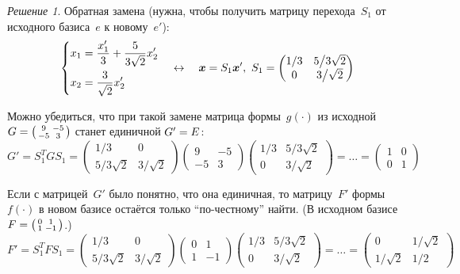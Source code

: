\documentclass[a4paper,12pt]{article}
\theoremstyle{remark}
\newtheorem*{finalsolution}{Решение}
\begin{document}
\begin{finalsolution}
    Обратная замена (нужна, чтобы получить матрицу перехода~$S_1$ от исходного базиса~$e$ к новому~$e'$):
    \[
      \left\{
        \begin{aligned}
          &x_1 = \frac{x_1'}{3} + \frac{5}{3 \sqrt{2}} x_2'\\
          &x_2 = \frac{3}{\sqrt{2}} x_2'
        \end{aligned}
      \right.
      \quad\leftrightarrow\quad \boldsymbol x = S_1 \boldsymbol x',\  S_1 = \begin{pmatrix}
        1/3 & 5 \big/ 3\sqrt{2}\\
        0   & 3 \big/ \sqrt{2}
      \end{pmatrix}
    \]
    
    Можно убедиться, что при такой замене матрица формы~$g(\cdot)$ из исходной~$G \hm= \left(\begin{smallmatrix} 9 & -5 \\ -5 & 3 \end{smallmatrix}\right)$ станет единичной $G' \hm= E$:
    \[
      G' = S_1^T G S_1 = \begin{pmatrix}
        1/3               & 0\\
        5 \big/ 3\sqrt{2} & 3 \big/ \sqrt{2}
      \end{pmatrix}
      \begin{pmatrix}
        9 & -5\\
        -5 & 3
      \end{pmatrix}
      \begin{pmatrix}
        1/3 & 5 \big/ 3\sqrt{2}\\
        0   & 3 \big/ \sqrt{2}
      \end{pmatrix}
      = \ldots = \begin{pmatrix}
        1 & 0\\
        0 & 1
      \end{pmatrix}
    \]
    
    Если с матрицей~$G'$ было понятно, что она единичная, то матрицу~$F'$ формы~$f(\cdot)$ в новом базисе остаётся только ``по-честному'' найти.
    (В исходном базисе $F \hm= \left(\begin{smallmatrix} 0 & 1 \\ 1 & -1 \end{smallmatrix}\right)$.)
    \[
      F' = S_1^T F S_1 = \begin{pmatrix}
        1/3               & 0\\
        5 \big/ 3\sqrt{2} & 3 \big/ \sqrt{2}
      \end{pmatrix}
      \begin{pmatrix}
        0 & 1\\
        1 & -1
      \end{pmatrix}
      \begin{pmatrix}
        1/3 & 5 \big/ 3\sqrt{2}\\
        0   & 3 \big/ \sqrt{2}
      \end{pmatrix}
      = \ldots = \begin{pmatrix}
        0                & 1 \big/ \sqrt{2}\\
        1 \big/ \sqrt{2} & 1/2
      \end{pmatrix}
    \]
    

\end{finalsolution}
\end{document}
